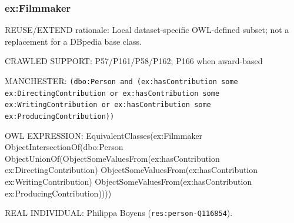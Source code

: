 \documentclass[
  11pt,
]{article}
\begin{document}
\subsubsection{ex:Filmmaker}\label{exfilmmaker}

REUSE/EXTEND rationale: Local dataset-\allowbreak{}specific\allowbreak{}
OWL-defined subset; not a replacement for a DBpedia base class.

CRAWLED SUPPORT:
P57/\allowbreak{}\allowbreak{}P161\allowbreak{}/\allowbreak{}\allowbreak{}P58/\allowbreak{}\allowbreak{}P16\allowbreak{}2;
P166 when award-based

MANCHESTER:
\texttt{(dbo:\allowbreak{}\allowbreak{}Per\allowbreak{}son and \allowbreak{}(ex:\allowbreak{}has\allowbreak{}C\allowbreak{}ontribut\allowbreak{}ion some\allowbreak{} ex:\allowbreak{}\allowbreak{}Dire\allowbreak{}cting\allowbreak{}Con\allowbreak{}tributio\allowbreak{}n or ex:\allowbreak{}has\allowbreak{}Contr\allowbreak{}ibution \allowbreak{}some ex:\allowbreak{}\allowbreak{}Writing\allowbreak{}C\allowbreak{}ontribut\allowbreak{}ion or e\allowbreak{}x:\allowbreak{}has\allowbreak{}Con\allowbreak{}tributio\allowbreak{}n some e\allowbreak{}x:\allowbreak{}\allowbreak{}Produc\allowbreak{}ing\allowbreak{}Contr\allowbreak{}ibution)\allowbreak{})}

OWL EXPRESSION:
Equivale\allowbreak{}nt\allowbreak{}Classe\allowbreak{}s(ex:\allowbreak{}\allowbreak{}Fil\allowbreak{}mmaker
Object\allowbreak{}In\allowbreak{}tersecti\allowbreak{}on\allowbreak{}Of(dbo\allowbreak{}:\allowbreak{}\allowbreak{}Person
Object\allowbreak{}Un\allowbreak{}ion\allowbreak{}Of(\allowbreak{}Ob\allowbreak{}ject\allowbreak{}Some\allowbreak{}\allowbreak{}Values\allowbreak{}Fr\allowbreak{}om(ex:\allowbreak{}ha\allowbreak{}s\allowbreak{}Contrib\allowbreak{}ution
ex:\allowbreak{}\allowbreak{}Direc\allowbreak{}ting\allowbreak{}Cont\allowbreak{}ribution\allowbreak{})
Object\allowbreak{}So\allowbreak{}me\allowbreak{}Values\allowbreak{}\allowbreak{}From(ex:\allowbreak{}has\allowbreak{}Contr\allowbreak{}ibution
ex:\allowbreak{}\allowbreak{}Writi\allowbreak{}ng\allowbreak{}Contri\allowbreak{}bution)
Object\allowbreak{}So\allowbreak{}me\allowbreak{}Values\allowbreak{}\allowbreak{}From(ex:\allowbreak{}has\allowbreak{}Contr\allowbreak{}ibution
ex:\allowbreak{}\allowbreak{}Produ\allowbreak{}cing\allowbreak{}Cont\allowbreak{}ribution\allowbreak{}))))

REAL INDIVIDUAL: Philippa Boyens
(\texttt{res:\allowbreak{}pers\allowbreak{}on-\allowbreak{}\allowbreak{}Q1168\allowbreak{}54}).
\end{document}
